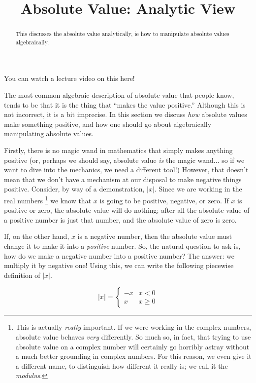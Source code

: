 \documentclass{ximera}
\title{Absolute Value: Analytic View}
\begin{document}
\begin{abstract}
    This discusses the absolute value analytically, ie how to manipulate absolute values algebraically.
\end{abstract}
\maketitle

You can watch a lecture video on this here!


The most common algebraic description of absolute value that people know, tends to be that it is the thing that ``makes the value positive.'' Although this is not incorrect, it is a bit imprecise. In this section we discuss \textit{how} absolute values make something positive, and how one should go about algebraically manipulating absolute values.

Firstly, there is no magic wand in mathematics that simply makes anything positive (or, perhaps we should say, absolute value \textit{is} the magic wand... so if we want to dive into the mechanics, we need a different tool!) However, that doesn't mean that we don't have a mechanism at our disposal to make negative things positive. Consider, by way of a demonstration, $|x|$. Since we are working in the real numbers%
\footnote{This is actually \textit{really} important. If we were working in the complex numbers, absolute value behaves \textit{very} differently. So much so, in fact, that trying to use absolute value on a complex number will certainly go horribly astray without a much better grounding in complex numbers. For this reason, we even give it a different name, to distinguish how different it really is; we call it the \textit{modulus}.}
we know that $x$ is going to be positive, negative, or zero. If $x$ is positive or zero, the absolute value will do nothing; after all the absolute value of a positive number is just that number, and the absolute value of zero is zero. 

If, on the other hand, $x$ is a negative number, then the absolute value must change it to make it into a \textit{positive} number. So, the natural question to ask is, how do we make a negative number into a positive number? The answer: we multiply it by negative one! Using this, we can write the following piecewise definition of $|x|$.

\[
    |x| = 
        \begin{cases}
            -x & x < 0 \\
            x & x \geq 0
        \end{cases}
\]
\end{document}
